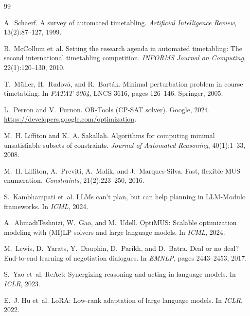 \documentclass[10pt,a4paper]{article}
\begin{document}
\vspace{4pt}
\small

\begin{thebibliography}{99}\setlength{\itemsep}{1pt}

A.~Schaerf. A survey of automated timetabling. \emph{Artificial Intelligence Review}, 13(2):87--127, 1999.

B.~McCollum et~al. Setting the research agenda in automated timetabling: The second international
timetabling competition. \emph{INFORMS Journal on Computing}, 22(1):120--130, 2010.

T.~M{\"u}ller, H.~Rudov{\'a}, and R.~Bart{\'a}k. Minimal perturbation problem in course timetabling.
In \emph{PATAT 2004}, LNCS 3616, pages 126--146. Springer, 2005.

L.~Perron and V.~Furnon. OR-Tools (CP-SAT solver). Google, 2024. \url{https://developers.google.com/optimization}.

M.~H. Liffiton and K.~A. Sakallah. Algorithms for computing minimal unsatisfiable subsets of constraints.
\emph{Journal of Automated Reasoning}, 40(1):1--33, 2008.

M.~H. Liffiton, A.~Previti, A.~Malik, and J.~Marques-Silva. Fast, flexible MUS enumeration.
\emph{Constraints}, 21(2):223--250, 2016.

S.~Kambhampati et~al. LLMs can't plan, but can help planning in LLM-Modulo frameworks. In \emph{ICML}, 2024.

A.~AhmadiTeshnizi, W.~Gao, and M.~Udell. OptiMUS: Scalable optimization modeling with (MI)LP solvers and
large language models. In \emph{ICML}, 2024.

M.~Lewis, D.~Yarats, Y.~Dauphin, D.~Parikh, and D.~Batra. Deal or no deal? End-to-end learning of
negotiation dialogues. In \emph{EMNLP}, pages 2443--2453, 2017.

S.~Yao et~al. ReAct: Synergizing reasoning and acting in language models. In \emph{ICLR}, 2023.

E.~J. Hu et~al. LoRA: Low-rank adaptation of large language models. In \emph{ICLR}, 2022.


\end{thebibliography}
\end{document}

